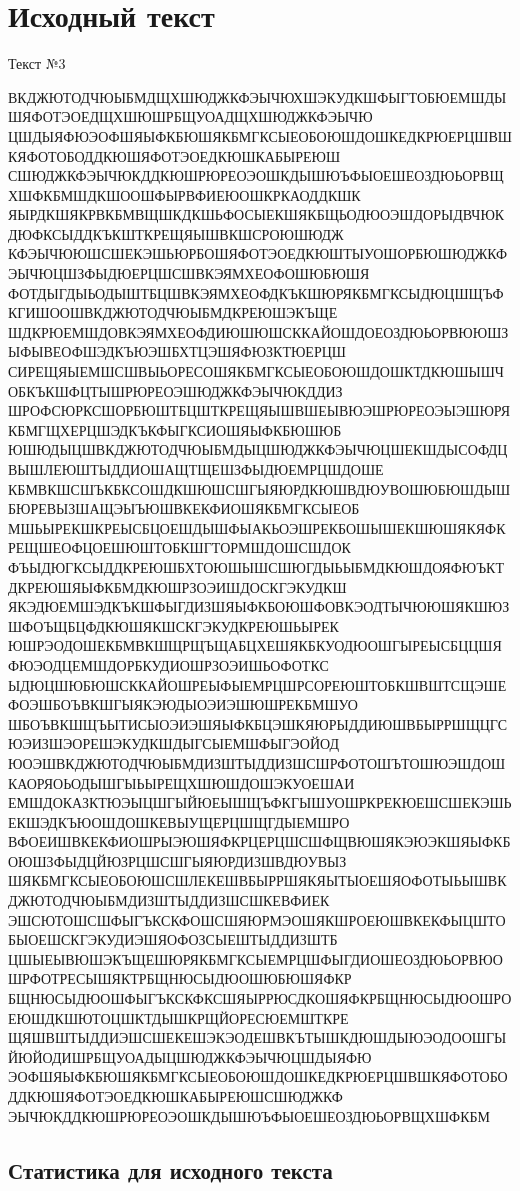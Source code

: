 \documentclass[a4paper, 14pt]{extarticle}
\begin{document}


\tableofcontents
\newpage

\section{Исходный текст}

Текст №3

ВКДЖЮТОДЧЮЫБМДЩХШЮДЖКФЭЫЧЮХШЭКУДКШФЫГТОБЮЕМШДЫШЯФОТЭОЕДЩХШЮШРБЩУОАДЩХШЮДЖКФЭЫЧЮ
ЦШДЫЯФЮЭОФШЯЫФКБЮШЯКБМГКСЫЕОБОЮШДОШКЕДКРЮЕРЦШВШКЯФОТОБОДДКЮШЯФОТЭОЕДКЮШКАБЫРЕЮШ
СШЮДЖКФЭЫЧЮКДДКЮШРЮРЕОЭОШКДЫШЮЪФЫОЕШЕОЗДЮЬОРВЩХШФКБМШДКШООШФЫРВФИЕЮОШКРКАОДДКШК
ЯЫРДКШЯКРВКБМВЩШКДКШЬФОСЫЕКШЯКБЩЬОДЮОЭШДОРЫДВЧЮКДЮФКСЫДДКЪКШТКРЕЩЯЫШВКШСРОЮШЮДЖ
КФЭЫЧЮЮШСШЕКЭШЬЮРБОШЯФОТЭОЕДКЮШТЫУОШОРБЮШЮДЖКФЭЫЧЮЦШЗФЫДЮЕРЦШСШВКЭЯМХЕОФОШЮБЮШЯ
ФОТДЫГДЫЬОДЫШТБЦШВКЭЯМХЕОФДКЪКШЮРЯКБМГКСЫДЮЦШЩЪФКГИШООШВКДЖЮТОДЧЮЫБМДКРЕЮШЭКЪЩЕ
ШДКРЮЕМШДОВКЭЯМХЕОФДИЮШЮШСККАЙОШДОЕОЗДЮЬОРВЮЮШЗЫФЫВЕОФШЭДКЪЮЭШБХТЦЭШЯФЮЗКТЮЕРЦШ
СИРЕЩЯЫЕМШСШВЫЬОРЕСОШЯКБМГКСЫЕОБОЮШДОШКТДКЮШЫШЧОБКЪКШФЦТЫШРЮРЕОЭШЮДЖКФЭЫЧЮКДДИЗ
ШРОФСЮРКСШОРБЮШТБЦШТКРЕЩЯЫШВШЕЫВЮЭШРЮРЕОЭЫЭШЮРЯКБМГЩХЕРЦШЭДКЪКФЫГКСИОШЯЫФКБЮШЮБ
ЮШЮДЫЦШВКДЖЮТОДЧЮЫБМДЫЦШЮДЖКФЭЫЧЮЦШЕКШДЫСОФДЦВЫШЛЕЮШТЫДДИОШАЩТЩЕШЗФЫДЮЕМРЦШДОШЕ
КБМВКШСШЪКБКСОШДКШЮШСШГЫЯЮРДКЮШВДЮУВОШЮБЮШДЫШБЮРЕВЫЗШАЩЭЫЪЮШВКЕКФИОШЯКБМГКСЫЕОБ
МШЬЫРЕКШКРЕЫСБЦОЕШДЫШФЫАКЬОЭШРЕКБОШЫШЕКШЮШЯКЯФКРЕЩШЕОФЦОЕШЮШТОБКШГТОРМШДОШСШДОК
ФЪЫДЮГКСЫДДКРЕЮШБХТОЮШЫШСШЮГДЫЬЫБМДКЮШДОЯФЮЪКТДКРЕЮШЯЫФКБМДКЮШРЗОЭИШДОСКГЭКУДКШ
ЯКЭДЮЕМШЭДКЪКШФЫГДИЗШЯЫФКБОЮШФОВКЭОДТЫЧЮЮШЯКШЮЗШФОЪЩБЦФДКЮШЯКШСКГЭКУДКРЕЮШЬЫРЕК
ЮШРЭОДОШЕКБМВКШЩРЩЪЩАБЦХЕШЯКБКУОДЮОШГЫРЕЫСБЦЦШЯФЮЭОДЦЕМШДОРБКУДИОШРЗОЭИШЬОФОТКС
ЫДЮЦШЮБЮШСККАЙОШРЕЫФЫЕМРЦШРСОРЕЮШТОБКШВШТСЩЭШЕФОЭШБОЪВКШГЫЯКЭЮДЫОЭИЭШЮШРЕКБМШУО
ШБОЪВКШЩЪЫТИСЫОЭИЭШЯЫФКБЦЭШКЯЮРЫДДИЮШВБЫРРШЩЦГСЮЭИЗШЭОРЕШЭКУДКШДЫГСЫЕМШФЫГЭОЙОД
ЮОЭШВКДЖЮТОДЧЮЫБМДИЗШТЫДДИЗШСШРФОТОШЪТОШЮЭШДОШКАОРЯОЬОДЫШГЫЬЫРЕЩХШЮШДОШЭКУОЕШАИ
ЕМШДОКАЗКТЮЭЫЦШГЫЙЮЕЫШЩЪФКГЫШУОШРКРЕКЮЕШСШЕКЭШЬЕКШЭДКЪЮОШДОШКЕВЫУЩЕРЦШЩГДЫЕМШРО
ВФОЕИШВКЕКФИОШРЫЭЮШЯФКРЦЕРЦШСШФЩВЮШЯКЭЮЭКШЯЫФКБОЮШЗФЫДЦЙЮЗРЦШСШГЫЯЮРДИЗШВДЮУВЫЗ
ШЯКБМГКСЫЕОБОЮШСШЛЕКЕШВБЫРРШЯКЯЫТЫОЕШЯОФОТЫЬЫШВКДЖЮТОДЧЮЫБМДИЗШТЫДДИЗШСШКЕВФИЕК
ЭШСЮТОШСШФЫГЪКСКФОШСШЯЮРМЭОШЯКШРОЕЮШВКЕКФЫЦШТОБЫОЕШСКГЭКУДИЭШЯОФОЗСЫЕШТЫДДИЗШТБ
ЦШЫЕЫВЮШЭКЪЩЕШЮРЯКБМГКСЫЕМРЦШФЫГДИОШЕОЗДЮЬОРВЮОШРФОТРЕСЫШЯКТРБЩНЮСЫДЮОШЮБЮШЯФКР
БЩНЮСЫДЮОШФЫГЪКСКФКСШЯЫРРЮСДКОШЯФКРБЩНЮСЫДЮОШРОЕЮШДКШЮТОЦШКТДЫШКРЩЙОРЕСЮЕМШТКРЕ
ЩЯШВШТЫДДИЭШСШЕКЕШЭКЭОДЕШВКЪТЫШКДЮШДЫЮЭОДООШГЫЙЮЙОДИШРБЩУОАДЫЦШЮДЖКФЭЫЧЮЦШДЫЯФЮ
ЭОФШЯЫФКБЮШЯКБМГКСЫЕОБОЮШДОШКЕДКРЮЕРЦШВШКЯФОТОБОДДКЮШЯФОТЭОЕДКЮШКАБЫРЕЮШСШЮДЖКФ
ЭЫЧЮКДДКЮШРЮРЕОЭОШКДЫШЮЪФЫОЕШЕОЗДЮЬОРВЩХШФКБМ

\subsection{Статистика для исходного текста}
\end{document}
